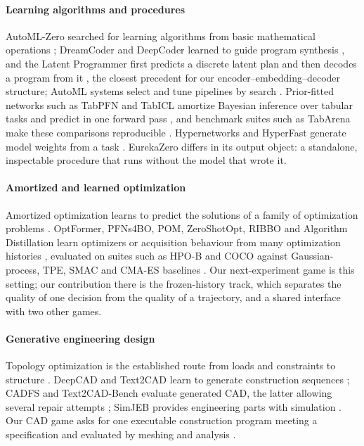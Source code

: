 \paragraph{Learning algorithms and procedures} AutoML-Zero searched for learning algorithms from
basic mathematical operations \citep{real2020automlzero}; DreamCoder and DeepCoder learned to guide
program synthesis \citep{ellis2021dreamcoder,balog2017deepcoder}, and the Latent Programmer first predicts a
discrete latent plan and then decodes a program from it \citep{hong2021latent}, the closest precedent for our
encoder--embedding--decoder structure; AutoML systems select and tune
pipelines by search \citep{feurer2015autosklearn}. Prior-fitted networks such as TabPFN and TabICL
amortize Bayesian inference over tabular tasks and predict in one forward pass
\citep{hollmann2025tabpfn,qu2025tabicl}, and benchmark suites such as TabArena make these
comparisons reproducible \citep{erickson2025tabarena}. Hypernetworks and HyperFast generate model
weights from a task \citep{ha2017hypernetworks,bonet2024hyperfast}. EurekaZero differs in its output
object: a standalone, inspectable procedure that runs without the model that wrote it.

\paragraph{Amortized and learned optimization} Amortized optimization learns to predict the
solutions of a family of optimization problems \citep{amos2023amortized}. OptFormer, PFNs4BO,
POM, ZeroShotOpt, RIBBO and Algorithm Distillation learn optimizers or acquisition behaviour from
many optimization histories
\citep{chen2022optformer,muller2023pfns4bo,li2024pom,meindl2025zeroshotopt,song2025ribbo,laskin2023ad},
evaluated on suites such as HPO-B and COCO \citep{pineda2021hpob,hansen2021coco} against Gaussian-process,
TPE, SMAC and CMA-ES baselines
\citep{snoek2012bo,balandat2020botorch,bergstra2011tpe,lindauer2022smac,hansen2019pycma}. Our
next-experiment game is this setting; our contribution there is the frozen-history track, which
separates the quality of one decision from the quality of a trajectory, and a shared interface with
two other games.

\paragraph{Generative engineering design} Topology optimization is the established route from loads
and constraints to structure \citep{bendsoe2003topology,sigmund2001topopt}. DeepCAD and Text2CAD
learn to generate construction sequences \citep{wu2021deepcad,khan2024text2cad}; CADFS and
Text2CAD-Bench evaluate generated CAD, the latter allowing several repair attempts
\citep{pyatov2026cadfs,wang2026text2cadbench}; SimJEB provides engineering parts with simulation
\citep{whalen2021simjeb}. Our CAD game asks for one executable construction program meeting a
specification and evaluated by meshing and analysis \citep{cadquery2024,geuzaine2009gmsh}.

